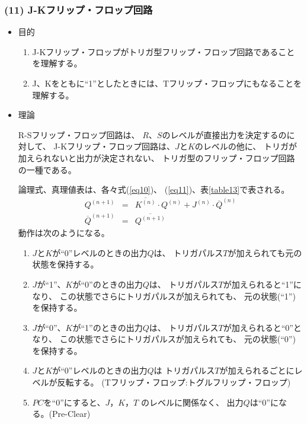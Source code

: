 \documentclass[12pt]{jarticle}
\begin{document}
\subsubsection*{(11) J-Kフリップ・フロップ回路}
\begin{itemize}
    \item 目的

          \begin{enumerate}
              \item J-Kフリップ・フロップがトリガ型フリップ・フロップ回路であることを理解する。
              \item J、Kをともに``1''としたときには、Tフリップ・フロップにもなることを理解する。
          \end{enumerate}
    \item 理論

          R-Sフリップ・フロップ回路は、
          $R$、$S$のレベルが直接出力を決定するのに対して、
          J-Kフリップ・フロップ回路は、$J$と$K$のレベルの他に、
          トリガが加えられないと出力が決定されない、
          トリガ型のフリップ・フロップ回路の一種である。

          論理式、真理値表は、各々式(\ref{eq10})、
          (\ref{eq11})、表\ref{table13}で表される。
          \begin{eqnarray}
              Q^{(n+1)} &=& \overline{K^{(n)}} \cdot Q^{(n)} + J^{(n)} \cdot {\overline{Q}}^{(n)} \label{eq10} \\
              {\overline{Q}}^{(n+1)} &=& \overline{Q^{(n+1)}} \label{eq11}
          \end{eqnarray}
          動作は次のようになる。

          \begin{enumerate}
              \item $J$と$K$が``0''レベルのときの出力$Q$は、
                    トリガパルス$T$が加えられても元の状態を保持する。
              \item $J$が``1''、$K$が``0''のときの出力$Q$は、
                    トリガパルス$T$が加えられると``1''になり、
                    この状態でさらにトリガパルスが加えられても、
                    元の状態(``1'')を保持する。
              \item $J$が``0''、$K$が``1''のときの出力$Q$は、
                    トリガパルス$T$が加えられると``0''となり、
                    この状態でさらにトリガパルスが加えられても、
                    元の状態(``0'')を保持する。
              \item $J$と$K$が``0''レベルのときの出力$Q$は
                    トリガパルス$T$が加えられるごとにレベルが反転する。
                    (Tフリップ・フロップ:トグルフリップ・フロップ)
              \item $PC$を``0''にすると、$J$，$K$，$T$ のレベルに関係なく、
                    出力$Q$は``0''になる。(Pre-Clear)
          \end{enumerate}


\end{itemize}
\end{document}
